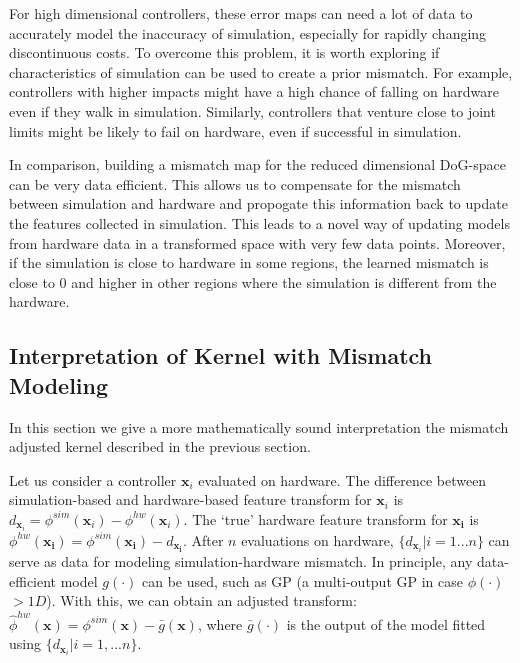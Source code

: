 
For high dimensional controllers, these error maps can  need a lot of data to accurately model the inaccuracy of simulation, especially for rapidly changing discontinuous costs. To overcome this problem, it is worth exploring if characteristics of simulation can be used to create a prior mismatch. For example, controllers with higher impacts might have a high chance of falling on hardware even if they walk in simulation. Similarly, controllers that venture close to joint limits might be likely to fail on hardware, even if successful in simulation. 

In comparison, building a mismatch map for the reduced dimensional DoG-space can be very data efficient. This allows us to compensate for the mismatch between simulation and hardware and propogate this information back to update the features collected in simulation. This leads to a novel way of updating models from hardware data in a transformed space with very few data points. Moreover, if the simulation is close to hardware in some regions, the learned mismatch is close to 0 and higher in other regions where the simulation is different from the hardware.

\subsection{Interpretation of Kernel with Mismatch Modeling}

In this section we give a more mathematically sound interpretation the mismatch adjusted kernel described in the previous section.

Let us consider a controller $\pmb{x}_i$ evaluated on hardware. The difference between simulation-based and hardware-based feature transform for $\pmb{x}_i$ is $d_{\pmb{x}_i} = \phi^{sim}(\pmb{x}_i) - \phi^{hw}(\pmb{x}_i)$. The `true' hardware feature transform for $\pmb{x_i}$ is $\phi^{hw}(\pmb{x_i}) = \phi^{sim}(\pmb{x_i}) - d_{\pmb{x_i}}$. After $n$ evaluations on hardware, $\{ d_{\pmb{x}_i} | i=1...n \}$ can serve as data for modeling simulation-hardware mismatch. In principle, any data-efficient model $g(\cdot)$ can be used, such as GP (a multi-output GP in case $\phi(\cdot)$ $>1D$). With this, we can obtain an adjusted transform: $\hat{\phi}^{hw}(\pmb{x}) = \phi^{sim}(\pmb{x}) - \bar{g}(\pmb{x})$, where $\bar{g}(\cdot)$ is the output of the model fitted using $\{d_{\pmb{x}_i} | i=1,...n \}$.

